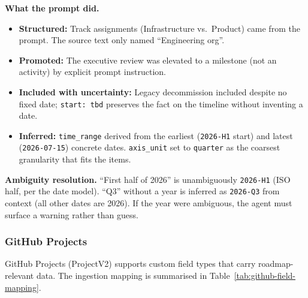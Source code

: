 \textbf{What the prompt did.}
\begin{itemize}
  \item \textbf{Structured:} Track assignments (Infrastructure vs.\ Product) came from the
        prompt. The source text only named ``Engineering org''.
  \item \textbf{Promoted:} The executive review was elevated to a milestone (not an
        activity) by explicit prompt instruction.
  \item \textbf{Included with uncertainty:} Legacy decommission included despite no
        fixed date; \texttt{start: tbd} preserves the fact on the timeline without
        inventing a date.
  \item \textbf{Inferred:} \texttt{time\_range} derived from the earliest (\texttt{2026-H1}
        start) and latest (\texttt{2026-07-15}) concrete dates. \texttt{axis\_unit}
        set to \texttt{quarter} as the coarsest granularity that fits the items.
\end{itemize}

\textbf{Ambiguity resolution.} ``First half of 2026'' is unambiguously \texttt{2026-H1}
(ISO half, per the date model). ``Q3'' without a year is inferred as \texttt{2026-Q3}
from context (all other dates are 2026). If the year were ambiguous, the agent must
surface a warning rather than guess.


\subsubsection{GitHub Projects}
\label{sec:ingest-github}

GitHub Projects (ProjectV2) \cite{github-projects,github-graphql-projectv2} supports
custom field types that carry roadmap-relevant data. The ingestion mapping is
summarised in Table~\ref{tab:github-field-mapping}.

